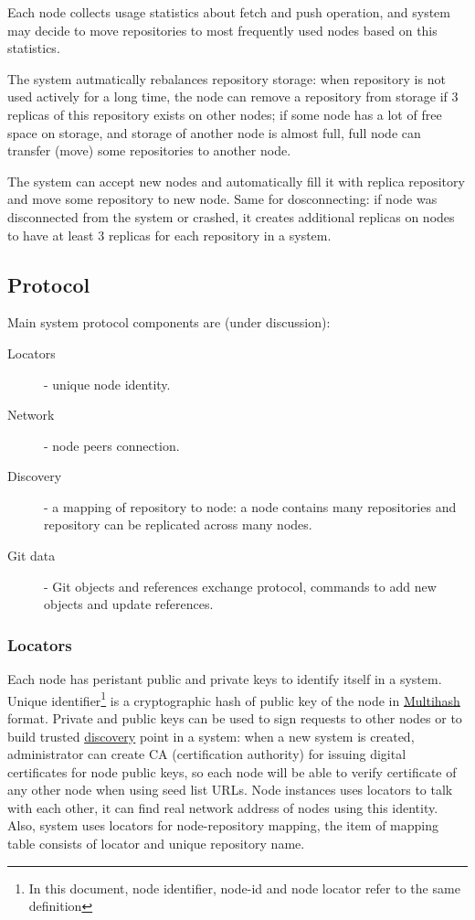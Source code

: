\documentclass[12pt,oneside]{article}
\begin{document}
Each node collects usage statistics about fetch and push operation, and system may decide to move repositories
to most frequently used nodes based on this statistics.

The system autmatically rebalances repository storage: when repository is not used actively for a
long time, the node can remove a repository from storage if 3 replicas of this repository exists on other nodes;
if some node has a lot of free space on storage, and storage of another node is almost full,
full node can transfer (move) some repositories to another node.

The system can accept new nodes and automatically fill it with replica repository and
move some repository to new node. Same for dosconnecting: if node was disconnected from the system or crashed,
it creates additional replicas on nodes to have at least 3 replicas for each repository in a system.


\subsection{Protocol}
Main system protocol components are (under discussion):
\begin{description}
  \item[Locators] - unique node identity.
  \item[Network] - node peers connection.
  \item[Discovery] - a mapping of repository to node: a node contains many repositories and
    repository can be replicated across many nodes.
  \item[Git data] - Git objects and references exchange protocol, commands to add new objects and update references.
\end{description}

\subsubsection{Locators}
Each node has peristant public and private keys to identify itself in a system.
Unique identifier\footnote{In this document, node identifier, node-id and node locator refer to the same definition}
is a cryptographic hash of public key of the node in \href{https://multiformats.io/multihash/}{Multihash} format.
Private and public keys can be used to sign requests to other nodes or to build trusted \hyperref[sec:discovery]{discovery}
point in a system: when a new system is created, administrator can create CA (certification authority) for issuing
digital certificates for node public keys, so each node will be able to verify certificate of any other node when
using seed list URLs. Node instances uses locators to talk with each other, it can find real network address of nodes using
this identity. Also, system uses locators for node-repository mapping, the item of mapping table consists of
locator and unique repository name.
\end{document}
